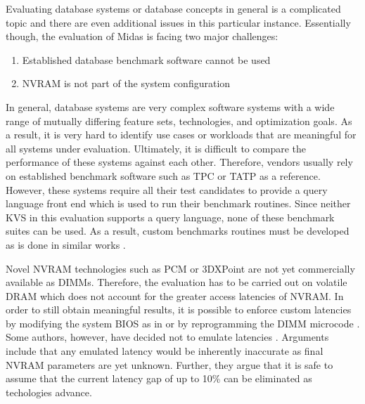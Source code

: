Evaluating database systems or database concepts in general is a complicated
topic and there are even additional issues in this particular instance.
Essentially though, the evaluation of Midas is facing two major challenges:

\begin{enumerate}
    \item Established database benchmark software cannot be used
    \item NVRAM is not part of the system configuration
\end{enumerate}

In general, database systems are very complex software systems with a wide range
of mutually differing feature sets, technologies, and optimization goals. As a
result, it is very hard to identify use cases or workloads that are meaningful
for all systems under evaluation. Ultimately, it is difficult to compare the
performance of these systems against each other. Therefore, vendors usually rely
on established benchmark software such as TPC \cite{schwalb2016hyrise} or TATP
\cite{oukid2015instant} as a reference. However, these systems require all their
test candidates to provide a query language front end which is used to run their
benchmark routines. Since neither KVS in this evaluation supports a query
language, none of these benchmark suites can be used. As a result, custom
benchmarks routines must be developed as is done in similar works
\cite{bailey2013exploring, zhou2016nvht}.

Novel NVRAM technologies such as PCM or 3DXPoint are not yet commercially
available as DIMMs. Therefore, the evaluation has to be carried out on volatile
DRAM which does not account for the greater access latencies of NVRAM. In order
to still obtain meaningful results, it is possible to enforce custom latencies
by modifying the system BIOS as in \cite{dulloor2014system, oukid2015instant} or
by reprogramming the DIMM microcode \cite{schwalb2016hyrise}. Some authors,
however, have decided not to emulate latencies \cite{bailey2013exploring,
zhou2016nvht}. Arguments include that any emulated latency would be inherently
inaccurate as final NVRAM parameters are yet unknown. Further, they argue that
it is safe to assume that the current latency gap of up to 10\% can be
eliminated as techologies advance.
